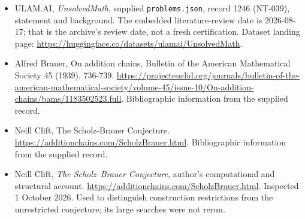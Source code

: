 \documentclass[11pt,a4paper]{article}
\begin{document}
{\small

\begin{itemize}

\item[\hypertarget{source:1246:1}{S1}] ULAM.AI, \emph{UnsolvedMath}, supplied \texttt{problems.json}, record 1246 (NT-039), statement and background. The embedded literature-review date is 2026-08-17; that is the archive’s review date, not a fresh certification. Dataset landing page: \url{https://huggingface.co/datasets/ulamai/UnsolvedMath}.

\item[\hypertarget{source:1246:2}{S2}] Alfred Brauer, On addition chains, Bulletin of the American Mathematical Society 45 (1939), 736-739. \url{https://projecteuclid.org/journals/bulletin-of-the-american-mathematical-society/volume-45/issue-10/On-addition-chains/bams/1183502523.full}. Bibliographic information from the supplied record.

\item[\hypertarget{source:1246:3}{S3}] Neill Clift, The Scholz-Brauer Conjecture. \url{https://additionchains.com/ScholzBrauer.html}. Bibliographic information from the supplied record.


\item[E1] Neill Clift, \emph{The Scholz--Brauer Conjecture},
author's computational and structural account.
\url{https://additionchains.com/ScholzBrauer.html}.
Inspected 1 October 2026. Used to distinguish construction restrictions
from the unrestricted conjecture; its large searches were not rerun.

\end{itemize}

}

\label{end:1246}
\end{document}
